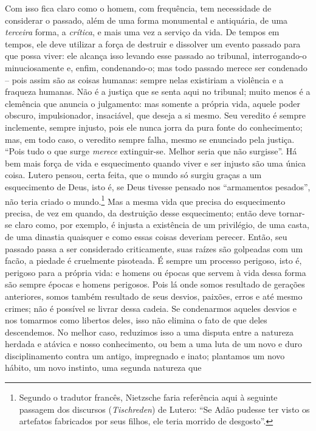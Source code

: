 Com isso fica claro como o homem, com frequência, tem necessidade de
considerar o passado, além de uma forma monumental e antiquária, de uma
\emph{terceira} forma, a \emph{crítica}, e mais uma vez a serviço da
vida. De tempos em tempos, ele deve utilizar a força de destruir e
dissolver um evento passado para que possa viver: ele alcança isso
levando esse passado ao tribunal, interrogando-o minuciosamente e, enfim,
condenando-o; mas todo passado merece ser condenado -- pois assim são as
coisas humanas: sempre nelas existiriam a violência e a fraqueza
humanas. Não é a justiça que se senta aqui no tribunal; muito menos é a
clemência que anuncia o julgamento: mas somente a própria vida, aquele
poder obscuro, impulsionador, insaciável, que deseja a si mesmo. Seu
veredito é sempre inclemente, sempre injusto, pois ele nunca jorra da
pura fonte do conhecimento; mas, em todo caso, o veredito sempre falha,
mesmo se enunciado pela justiça. ``Pois tudo o que surge
\emph{merece} extinguir-se. Melhor seria que não surgisse''. Há bem mais
força de vida e esquecimento quando viver e ser injusto são uma única
coisa. Lutero pensou, certa feita, que o mundo só surgiu graças a um
esquecimento de Deus, isto é, se Deus tivesse pensado nos ``armamentos
pesados'', não teria criado o mundo.\footnote{Segundo o tradutor francês,
  Nietzsche faria referência aqui à seguinte passagem dos discursos
  (\emph{Tischreden}) de Lutero: ``Se Adão pudesse ter visto os
  artefatos fabricados por seus filhos, ele teria morrido de desgosto''.}
Mas a mesma vida que precisa do esquecimento precisa, de vez em quando,
da destruição desse esquecimento; então deve tornar-se claro como, por
exemplo, é injusta a existência de um privilégio, de uma casta, de uma
dinastia quaisquer e como essas coisas deveriam perecer. Então, seu
passado passa a ser considerado criticamente, suas raízes são
golpeadas com um facão, a piedade é cruelmente pisoteada. É sempre
um processo perigoso, isto é, perigoso para a própria vida: e homens ou
épocas que servem à vida dessa forma são sempre épocas e homens 
perigosos. Pois lá onde somos resultado de gerações anteriores, somos
também resultado de seus desvios, paixões, erros e até mesmo crimes; não
é possível se livrar dessa cadeia. Se condenarmos aqueles desvios e nos
tomarmos como libertos deles, isso não elimina o fato de que deles
descendemos.\label{delesdescendemos} No melhor caso, reduzimos isso a uma disputa entre a
natureza herdada e atávica e nosso conhecimento, ou bem a uma luta de um
novo e duro disciplinamento contra um antigo, impregnado e inato;
plantamos um novo hábito, um novo instinto, uma segunda natureza que
